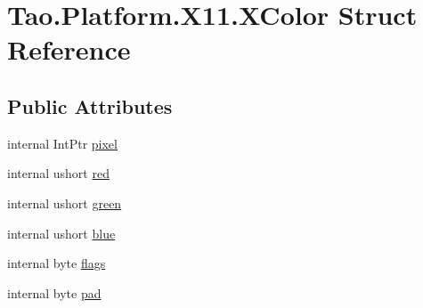 \hypertarget{struct_tao_1_1_platform_1_1_x11_1_1_x_color}{
\section{Tao.Platform.X11.XColor Struct Reference}
\label{struct_tao_1_1_platform_1_1_x11_1_1_x_color}
}
\subsection*{Public Attributes}
\begin{DoxyCompactItemize}
\item 
internal IntPtr \hyperlink{struct_tao_1_1_platform_1_1_x11_1_1_x_color_a8b1976250885add0db5cb35d5c5ee33f}{pixel}
\item 
internal ushort \hyperlink{struct_tao_1_1_platform_1_1_x11_1_1_x_color_a1c281328bb943945a2384f73ac16d5cc}{red}
\item 
internal ushort \hyperlink{struct_tao_1_1_platform_1_1_x11_1_1_x_color_a2e11496595fee64f670691fbec9a8902}{green}
\item 
internal ushort \hyperlink{struct_tao_1_1_platform_1_1_x11_1_1_x_color_a7ff7fee40431ce572ddb054186663de0}{blue}
\item 
internal byte \hyperlink{struct_tao_1_1_platform_1_1_x11_1_1_x_color_afa7bb1b11e1b11ef53c36a500a2adbd7}{flags}
\item 
internal byte \hyperlink{struct_tao_1_1_platform_1_1_x11_1_1_x_color_a2092f63071948e4a3163a3ce8a834a13}{pad}
\end{DoxyCompactItemize}


